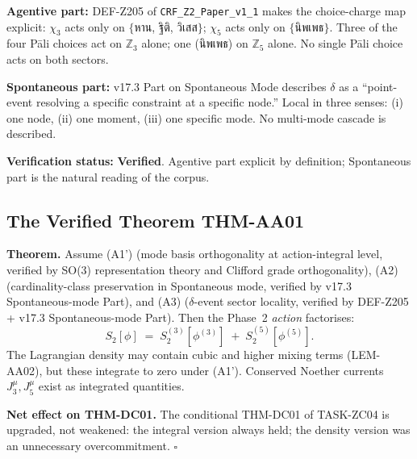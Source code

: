 \documentclass[12pt, a4paper]{article}
\begin{document}
\begin{formalbox}[title={(A3) Verification --- Sources}]
\textbf{Agentive part:} DEF-Z205 of \texttt{CRF\_Z2\_Paper\_v1\_1}
makes the choice-charge map explicit: $\chi_3$ acts only on
$\{$\textthai{หาน, ฐิติ, วิเสส}$\}$; $\chi_5$ acts only on
$\{$\textthai{นิพเพธ}$\}$. Three of the four Pāli choices act on
$\mathbb{Z}_3$ alone; one (\textthai{นิพเพธ}) on $\mathbb{Z}_5$
alone. No single Pāli choice acts on both sectors.

\textbf{Spontaneous part:} v17.3 Part on Spontaneous Mode describes
$\delta$ as a ``point-event resolving a specific constraint at a
specific node.'' Local in three senses: (i) one node, (ii) one
moment, (iii) one specific mode. No multi-mode cascade is described.

\textbf{Verification status:} \textbf{Verified}. Agentive part
explicit by definition; Spontaneous part is the natural reading of
the corpus.
\end{formalbox}

\subsection{The Verified Theorem THM-AA01}

\begin{formalbox}[title={THM-AA01: Dynamic CRT under (A1'), (A2), (A3)}]
\textbf{Theorem.} Assume (A1') (mode basis orthogonality at
action-integral level, verified by SO(3) representation theory and
Clifford grade orthogonality), (A2) (cardinality-class preservation
in Spontaneous mode, verified by v17.3 Spontaneous-mode Part), and
(A3) ($\delta$-event sector locality, verified by DEF-Z205 + v17.3
Spontaneous-mode Part). Then the Phase~2 \emph{action} factorises:
\begin{equation}
  \boxed{\;
  S_2[\phi]
  \;=\;
  S_2^{(3)}[\phi^{(3)}]
  \;+\;
  S_2^{(5)}[\phi^{(5)}].
  \;}
  \label{eq:THM-AA01}
\end{equation}
The Lagrangian density may contain cubic and higher mixing terms
(LEM-AA02), but these integrate to zero under (A1'). Conserved
Noether currents $J^\mu_3, J^\mu_5$ exist as integrated quantities.

\textbf{Net effect on THM-DC01.} The conditional THM-DC01 of
TASK-ZC04 is upgraded, not weakened: the integral version always
held; the density version was an unnecessary overcommitment. \hfill$\square$
\end{formalbox}
\end{document}

